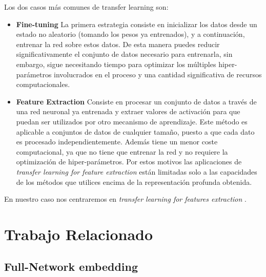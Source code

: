 \documentclass[12,twoside]{TFG-GM}
\theoremstyle{definition}
\theoremstyle{remark}
\begin{document}
Los dos casos más comunes de transfer learning son: 

\begin{itemize}
\item \textbf{Fine-tuning} La primera estrategia consiste en inicializar los datos desde un estado no aleatorio (tomando los pesos ya entrenados), y a continuación, entrenar la red sobre estos datos. 
De esta manera puedes reducir significativamente el conjunto de datos necesario para entrenarla, sin embargo, sigue necesitando tiempo para optimizar los múltiples hiper-parámetros involucrados en el proceso y una cantidad significativa de recursos computacionales. 


\item \textbf{Feature Extraction} Consiste en procesar un conjunto de datos a través de una red neuronal ya entrenada y extraer valores de activación para que puedan ser utilizados por otro mecanismo de aprendizaje. Este método es aplicable a conjuntos de datos de cualquier tamaño, puesto a que cada dato es procesado independientemente. Además tiene un menor coste computacional, ya que no tiene que entrenar la red y no requiere la optimización de hiper-parámetros. Por estos motivos las aplicaciones de \textit{transfer learning for feature extraction} están limitadas solo a las  capacidades de los métodos que utilices encima de la representación profunda obtenida. 


\end{itemize}

En nuestro caso nos centraremos en \textit{transfer learning for features extraction} \cite{behaviourcnn}. 




\newpage

\section{Trabajo Relacionado}

\subsection{Full-Network embedding}
\end{document}
